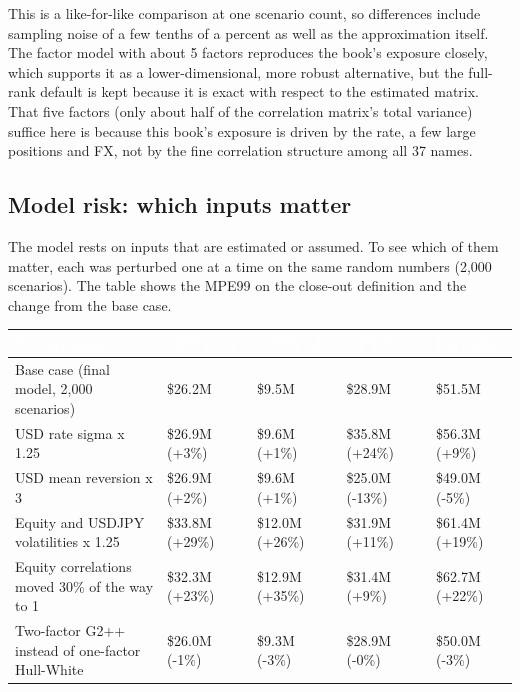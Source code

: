 \documentclass[11pt,letterpaper]{article}
\begin{document}
This is a like-for-like comparison at one scenario count, so differences include sampling noise of a few tenths of a percent as well as the approximation itself. The factor model with about 5 factors reproduces the book's exposure closely, which supports it as a lower-dimensional, more robust alternative, but the full-rank default is kept because it is exact with respect to the estimated matrix. That five factors (only about half of the correlation matrix's total variance) suffice here is because this book's exposure is driven by the rate, a few large positions and FX, not by the fine correlation structure among all 37 names.

\subsection{Model risk: which inputs matter}
The model rests on inputs that are estimated or assumed. To see which of them matter, each was perturbed one at a time on the same random numbers (2,000 scenarios). The table shows the MPE99 on the close-out definition and the change from the base case.

{\scriptsize\setlength{\LTpre}{4pt}\setlength{\LTpost}{6pt}
\begin{longtable}{>{\raggedright\arraybackslash}p{}>{\raggedright\arraybackslash}p{}>{\raggedright\arraybackslash}p{}>{\raggedright\arraybackslash}p{}>{\raggedright\arraybackslash}p{}}
\toprule
\rowcolor{navy}\textbf{\textcolor{white}{Perturbation}} & \textbf{\textcolor{white}{CPTY\_A}} & \textbf{\textcolor{white}{CPTY\_B}} & \textbf{\textcolor{white}{CPTY\_C}} & \textbf{\textcolor{white}{Portfolio}} \\
\endhead
Base case (final model, 2,000 scenarios) & \$26.2M & \$9.5M & \$28.9M & \$51.5M \\
\rowcolor{gray!9}USD rate sigma x 1.25 & \$26.9M (+3\%) & \$9.6M (+1\%) & \$35.8M (+24\%) & \$56.3M (+9\%) \\
USD mean reversion x 3 & \$26.9M (+2\%) & \$9.6M (+1\%) & \$25.0M (-13\%) & \$49.0M (-5\%) \\
\rowcolor{gray!9}Equity and USDJPY volatilities x 1.25 & \$33.8M (+29\%) & \$12.0M (+26\%) & \$31.9M (+11\%) & \$61.4M (+19\%) \\
Equity correlations moved 30\% of the way to 1 & \$32.3M (+23\%) & \$12.9M (+35\%) & \$31.4M (+9\%) & \$62.7M (+22\%) \\
\rowcolor{gray!9}Two-factor G2++ instead of one-factor Hull-White & \$26.0M (-1\%) & \$9.3M (-3\%) & \$28.9M (-0\%) & \$50.0M (-3\%) \\
\bottomrule
\end{longtable}}
\end{document}
